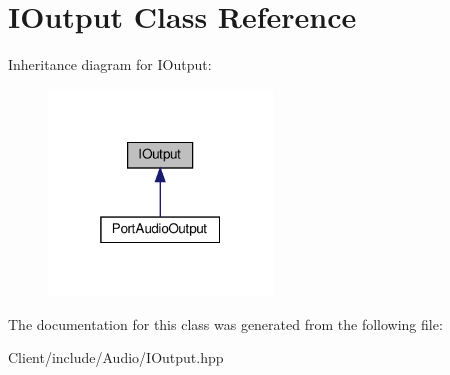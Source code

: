 \hypertarget{class_i_output}{}\section{I\+Output Class Reference}
\label{class_i_output}


Inheritance diagram for I\+Output\+:
\nopagebreak
\begin{figure}[H]
\begin{center}
\leavevmode
\includegraphics[width=169pt]{class_i_output__inherit__graph}
\end{center}
\end{figure}


The documentation for this class was generated from the following file\+:\begin{DoxyCompactItemize}
\item 
Client/include/\+Audio/I\+Output.\+hpp\end{DoxyCompactItemize}
